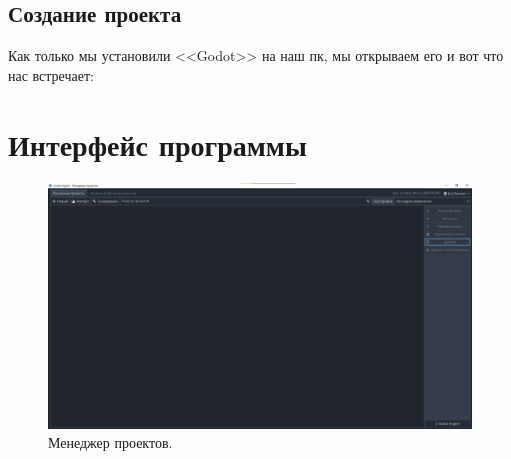 \subsection{\label{subsec:ch02/sec02/sub01}Создание проекта}
Как только мы установили <<Godot>> на наш пк, мы открываем его и вот что нас встречает:
\section{\label{sec:ch02/sec02}Интерфейс программы}

\begin{figure}[h]
    \centering
    \includegraphics[width=1\textwidth]{images/Менеджер проектов.png}
\caption{\centering\label{fig:example05}Менеджер проектов.}
\end{figure}
